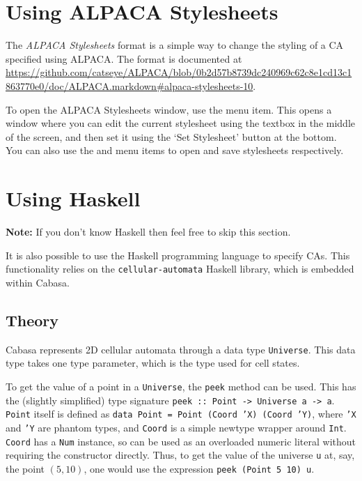 \documentclass[oneside,a4paper]{memoir}
\begin{document}
\section{Using ALPACA Stylesheets}
\label{sec:stys}

The \emph{ALPACA Stylesheets} format is a simple way to change the styling of a CA specified using ALPACA.
The format is documented at \url{https://github.com/catseye/ALPACA/blob/0b2d57b8739dc240969c62c8e1cd13c1863770e0/doc/ALPACA.markdown#alpaca-stylesheets-10}.

To open the ALPACA Stylesheets window, use the  menu item.
This opens a window where you can edit the current stylesheet using the textbox in the middle of the screen,
  and then set it using the `Set Stylesheet' button at the bottom.
You can also use the  and  menu items to open and save stylesheets respectively.

\section{Using Haskell}
\label{sec:ushs}

\textbf{Note:} If you don't know Haskell then feel free to skip this section.

\vspace{2ex}

\noindent It is also possible to use the Haskell programming language to specify CAs.
This functionality relies on the \texttt{cellular-automata} Haskell library, which is embedded within Cabasa.

\subsection{Theory}
\label{sec:hsth}

Cabasa represents 2D cellular automata through a data type \texttt{Universe}.
This data type takes one type parameter, which is the type used for cell states.

To get the value of a point in a \texttt{Universe}, the \texttt{peek} method can be used.
This has the (slightly simplified) type signature \texttt{peek :: Point -> Universe a -> a}.
\texttt{Point} itself is defined as \texttt{data Point = Point (Coord 'X) (Coord 'Y)},
  where \texttt{'X} and \texttt{'Y} are phantom types,
  and \texttt{Coord} is a simple newtype wrapper around \texttt{Int}.
\texttt{Coord} has a \texttt{Num} instance,
  so can be used as an overloaded numeric literal without requiring the constructor directly.
Thus, to get the value of the universe \texttt{u} at, say, the point $(5, 10)$,
  one would use the expression \texttt{peek (Point 5 10) u}.
\end{document}
